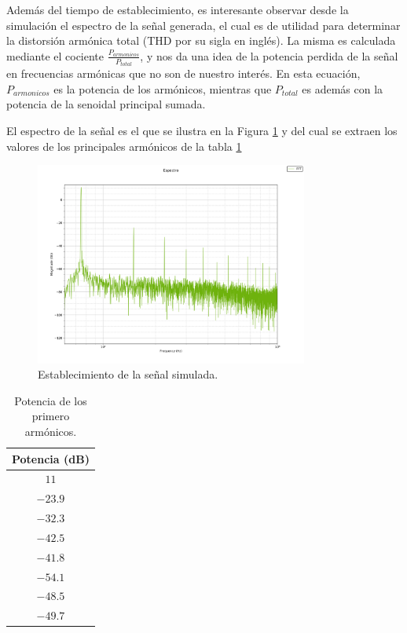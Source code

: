 Además del tiempo de establecimiento, es interesante observar desde la simulación el espectro de la señal generada, el cual es de utilidad para determinar 
la distorsión armónica total (THD por su sigla en inglés).
La misma es calculada mediante el cociente $\frac{P_{armonicos}}{P_{total}}$, y nos da una idea de la potencia perdida de la señal en 
frecuencias armónicas que no son de nuestro interés.
En esta ecuación, $P_{armonicos}$ es la potencia de los armónicos, mientras que $P_{total}$ es además con la potencia de la senoidal principal sumada.

El espectro de la señal es el que se ilustra en la Figura \ref{fig:fft_ex1} y del cual se extraen los valores de los principales armónicos de la tabla \ref{tab:thd_ex1}
\begin{figure}[H]
    \centering
    \includegraphics[width=0.8\textwidth]{../EJ1/Recursos/fft.png}
    \caption{Establecimiento de la señal simulada.}
    \label{fig:fft_ex1}    
\end{figure}

\begin{table}[H]
    \centering
    \begin{tabular}{c}
    \textbf{Potencia (dB)} \\ \hline
    $11$                   \\
    $-23.9$                \\
    $-32.3$                \\
    $-42.5$                \\
    $-41.8$                \\
    $-54.1$                \\
    $-48.5$                \\
    $-49.7$               
    \end{tabular}
    \caption{Potencia de los primero armónicos.}
    \label{tab:thd_ex1}
\end{table}

